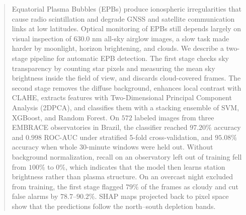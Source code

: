 \begin{abstract}
Equatorial Plasma Bubbles (EPBs) produce ionospheric irregularities that cause radio scintillation and degrade GNSS and satellite communication links at low latitudes. Optical monitoring of EPBs still depends largely on visual inspection of $630.0\text{ nm}$ all-sky airglow images, a slow task made harder by moonlight, horizon brightening, and clouds. We describe a two-stage pipeline for automatic EPB detection. The first stage checks sky transparency by counting star pixels and measuring the mean sky brightness inside the field of view, and discards cloud-covered frames. The second stage removes the diffuse background, enhances local contrast with CLAHE, extracts features with Two-Dimensional Principal Component Analysis (2DPCA), and classifies them with a stacking ensemble of SVM, XGBoost, and Random Forest. On $572$ labeled images from three EMBRACE observatories in Brazil, the classifier reached $97.20\%$ accuracy and $0.998$ ROC-AUC under stratified 5-fold cross-validation, and $95.08\%$ accuracy when whole $30$-minute windows were held out. Without background normalization, recall on an observatory left out of training fell from $100\%$ to $0\%$, which indicates that the model then learns station brightness rather than plasma structure. On an overcast night excluded from training, the first stage flagged $79\%$ of the frames as cloudy and cut false alarms by $78.7$--$90.2\%$. SHAP maps projected back to pixel space show that the predictions follow the north--south depletion bands.

\end{abstract}
